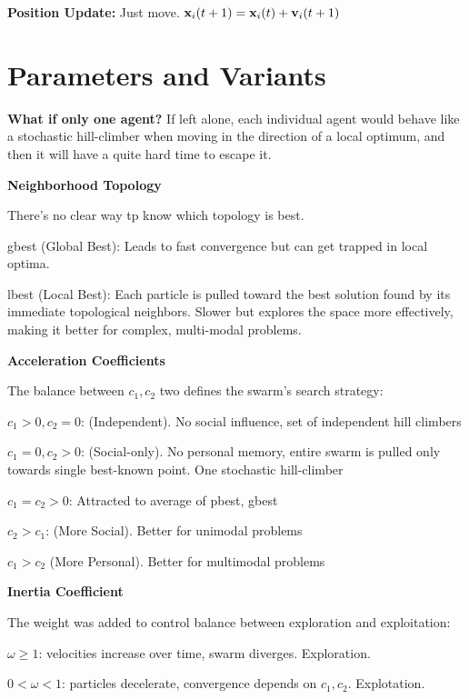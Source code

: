 \textbf{Position Update:} 
Just move. 
$
\mathbf{x}_i(t+1) = \mathbf{x}_i(t) + \mathbf{v}_i(t+1)
$

\section*{Parameters and Variants}

\textbf{What if only one agent?}
If left alone, each individual agent would behave like a stochastic hill-climber when moving
in the direction of a local optimum, and then it will have a quite hard time to escape it.

\textbf{Neighborhood Topology} 

There's no clear way tp know which topology is best. 

\begin{tightitemize}
    \item gbest (Global Best): Leads to fast convergence but can get trapped in local optima.
    \item lbest (Local Best): Each particle is pulled toward the best solution found by its immediate topological neighbors. Slower but explores the space more effectively, making it better for complex, multi-modal problems.
\end{tightitemize}

\textbf{Acceleration Coefficients}

The balance between $c_1, c_2$ two defines the swarm's search strategy:

\begin{tightitemize}
    \item $c_1 > 0, c_2 = 0$: (Independent). No social influence, set of independent hill climbers 
    \item $c_1 = 0, c_2 > 0$: (Social-only). No personal memory, entire swarm is pulled 
    only towards single best-known point. One stochastic hill-climber 
    \item $c_1 = c_2 > 0$: Attracted to average of pbest, gbest 
    \item $c_2 > c_1$: (More Social). Better for unimodal problems
    \item $c_1 > c_2$ (More Personal). Better for multimodal problems
\end{tightitemize}

\textbf{Inertia Coefficient}

The weight was added to control balance between exploration and exploitation:

\begin{tightitemize}
    \item $\omega \ge 1$: velocities increase over time, swarm diverges. Exploration.
    \item $0 < \omega < 1$: particles decelerate, convergence depends on $c_1, c_2$. Explotation.
\end{tightitemize}

